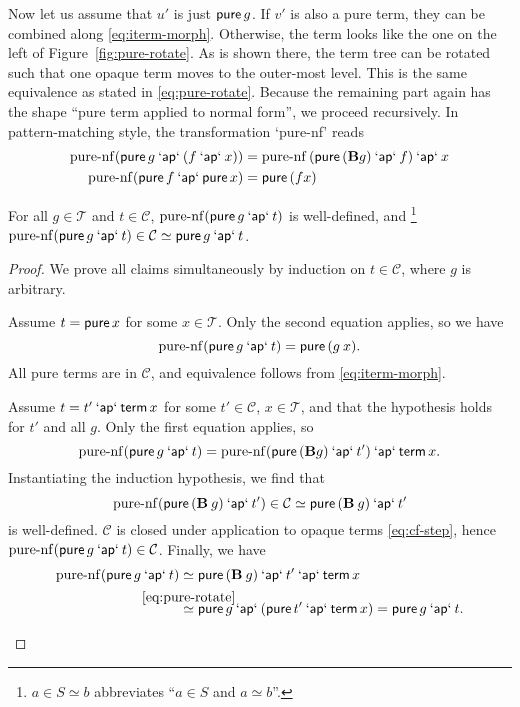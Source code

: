 Now let us assume that $u'$ is just $\operatorname{\mathsf{pure}} g$.
If $v'$ is also a pure term, they can be combined along \eqref{eq:iterm-morph}.
Otherwise, the term looks like the one on the left of Figure~\ref{fig:pure-rotate}.
As is shown there, the term tree can be rotated such that one opaque term moves
to the outer-most level.
This is the same equivalence as stated in \eqref{eq:pure-rotate}.
Because the remaining part again has the shape ``pure term applied to normal
form'', we proceed recursively.
In pattern-matching style, the transformation `pure-nf' reads
\begin{align}
	\operatorname{pure-nf}(\operatorname{\mathsf{pure}} g \mathbin{\mathsf{`ap`}} (f \mathbin{\mathsf{`ap`}} x)) &=
		\operatorname{pure-nf}{(\operatorname{\mathsf{pure}}{(\mathbf{B} g)} \mathbin{\mathsf{`ap`}} f)} \mathbin{\mathsf{`ap`}} x \\
	\operatorname{pure-nf}(\operatorname{\mathsf{pure}} f \mathbin{\mathsf{`ap`}} \operatorname{\mathsf{pure}} x) &= \operatorname{\mathsf{pure}}{(f x)}
\end{align}
\begin{lemma}\label{thm:pure-nf}\raggedright
For all $g \in \mathcal{T}$ and $t \in \mathcal{C}$,
$\operatorname{pure-nf}(\operatorname{\mathsf{pure}} g \mathbin{\mathsf{`ap`}} t)$ is well-defined, and%
\/\footnote{$a \in S \simeq b$ abbreviates ``$a \in S$ and $a \simeq b$''.}
$\operatorname{pure-nf}(\operatorname{\mathsf{pure}} g \mathbin{\mathsf{`ap`}} t) \in \mathcal{C} \simeq \operatorname{\mathsf{pure}} g \mathbin{\mathsf{`ap`}} t$.
\end{lemma}
\begin{proof}
We prove all claims simultaneously by induction on $t \in \mathcal{C}$,
where $g$ is arbitrary.
\begin{prfcases}\raggedright
\item Assume $t = \operatorname{\mathsf{pure}} x$ for some $x \in \mathcal{T}$.
	Only the second equation applies, so we have
	\[ \operatorname{pure-nf}(\operatorname{\mathsf{pure}} g \mathbin{\mathsf{`ap`}} t) = \operatorname{\mathsf{pure}}{(g \> x)}. \]
	All pure terms are in $\mathcal{C}$, and equivalence follows from
	\eqref{eq:iterm-morph}.
\item Assume $t = t' \mathbin{\mathsf{`ap`}} \operatorname{\mathsf{term}} x$ for some
	$t' \in \mathcal{C}$, $x \in \mathcal{T}$, and that the hypothesis holds
	for $t'$ and all $g$.
	Only the first equation applies, so
	\[ \operatorname{pure-nf}(\operatorname{\mathsf{pure}} g \mathbin{\mathsf{`ap`}} t) =
		\operatorname{pure-nf}(\operatorname{\mathsf{pure}}{(\mathbf{B} g)} \mathbin{\mathsf{`ap`}} t') \mathbin{\mathsf{`ap`}} \operatorname{\mathsf{term}} x. \]
	Instantiating the induction hypothesis, we find that
	\[ \operatorname{pure-nf}(\operatorname{\mathsf{pure}}{(\mathbf{B} \> g)} \mathbin{\mathsf{`ap`}} t') \in \mathcal{C} \simeq
		\operatorname{\mathsf{pure}}{(\mathbf{B} \> g)} \mathbin{\mathsf{`ap`}} t' \]
	is well-defined.
	$\mathcal{C}$ is closed under application to opaque terms \eqref{eq:cf-step},
	hence $\operatorname{pure-nf}(\operatorname{\mathsf{pure}} g \mathbin{\mathsf{`ap`}} t) \in \mathcal{C}$.
	Finally, we have
	\begin{align*}
		\operatorname{pure-nf}(\spure g \sap t) &\simeq
			\spure{(\mathbf{B} \sapp g)} \sap t' \sap \sterm x \\
		&\stackrel{\mathclap{\eqref{eq:pure-rotate}}}{\simeq}
			\spure g \sap (\spure t' \sap \sterm x) =
			\spure g \sap t. \qedhere
	\end{align*}
\end{prfcases}
\end{proof}

